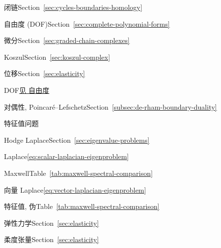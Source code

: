 \begin{theindex}
\item {}\label{index:cycle}{闭链}\quad Section~\ref{sec:cycles-boundaries-homology}

\item {}\label{index:degree-of-freedom-dof}{自由度 (DOF)}\quad Section~\ref{sec:complete-polynomial-forms}

\item {}\label{index:differential}{微分}\quad Section~\ref{sec:graded-chain-complexes}

\subitem {}\label{index:differential-koszul}{Koszul}\quad Section~\ref{sec:koszul-complex}

\item {}\label{index:displacement}{位移}\quad Section~\ref{sec:elasticity}

\item {}\label{index:dof}{DOF}\quad \hyperref[index:degree-of-freedom-dof]{{见 自由度}}

\item {}\label{index:duality-poincar-lefschetz}{对偶性, Poincaré–Lefschetz}\quad Section~\ref{subsec:de-rham-boundary-duality}

\item {}\label{index:eigenvalue-problem}{特征值问题}

\subitem {}\label{index:eigenvalue-problem-hodge-laplace}{Hodge Laplace}\quad Section~\ref{sec:eigenvalue-problems}

\subitem {}\label{index:eigenvalue-problem-laplace}{Laplace}\quad \eqref{eq:scalar-laplacian-eigenproblem}

\subitem {}\label{index:eigenvalue-problem-maxwell}{Maxwell}\quad Table~\ref{tab:maxwell-spectral-comparison}

\subitem {}\label{index:eigenvalue-problem-vector-laplace}{向量 Laplace}\quad \eqref{eq:vector-laplacian-eigenproblem}

\item {}\label{index:eigenvalue-spurious}{特征值, 伪}\quad Table~\ref{tab:maxwell-spectral-comparison}

\item {}\label{index:elasticity}{弹性力学}\quad Section~\ref{sec:elasticity}

\subitem {}\label{index:elasticity-compliance-tensor}{柔度张量}\quad Section~\ref{sec:elasticity}


\end{theindex}
